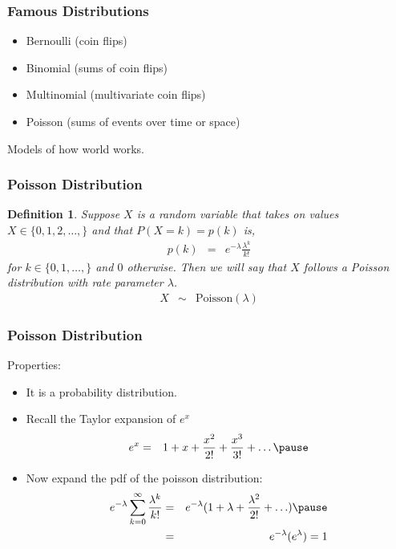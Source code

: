 \documentclass{beamer}
\newtheorem{defn}{Definition}
\numberwithin{equation}{section}
\begin{document}
\begin{frame}
\frametitle{Famous Distributions}

\begin{itemize}
\item[-] Bernoulli (coin flips)
\item[-] Binomial (sums of coin flips)
\item[-] Multinomial (multivariate coin flips)
\item[-] Poisson (sums of events over time or space)
\end{itemize}

\alert{Models} of how world works.  


\end{frame}



\begin{frame}
\frametitle{Poisson Distribution}

\begin{defn}
Suppose $X$ is a random variable that takes on values $X \in \{0, 1, 2, \hdots, \}$ and that $P(X = k) = p(k)$ is,
\begin{eqnarray}
p(k) & = & e^{-\lambda} \frac{\lambda^{k}}{k!} \nonumber 
\end{eqnarray}
for $k \in \{0, 1, \hdots, \}$ and $0$ otherwise.  Then we will say that $X$ follows a \alert{Poisson} distribution with \alert{rate} parameter $\lambda$.  \\
\begin{eqnarray}
X & \sim & \text{Poisson}(\lambda) \nonumber 
\end{eqnarray}

\end{defn}




\end{frame}






\begin{frame}
\frametitle{Poisson Distribution}
Properties:
\begin{itemize}
\item[1)] It is a probability distribution. \\
\item Recall the \alert{Taylor expansion} of $e^{x}$
\begin{eqnarray}
e^{x} & = & 1 + x + \frac{x^{2}}{2!} + \frac{x^3}{3!} + \hdots \nonumber \pause 
\end{eqnarray}
\item Now expand the pdf of the poisson distribution:
\begin{eqnarray}
e^{-\lambda} \sum_{k=0}^{\infty} \frac{\lambda^{k} }{k!} & = & e^{-\lambda}(1 + \lambda  + \frac{\lambda^2}{2!} + \hdots ) \nonumber  \pause\\
 & = & e^{-\lambda} (e^{\lambda}) = 1 \nonumber 
\end{eqnarray}
\end{itemize}

\end{frame}
\end{document}
